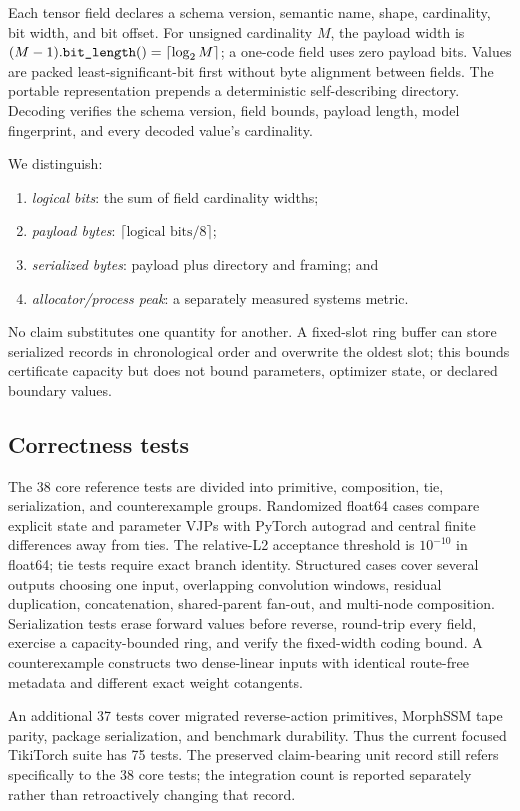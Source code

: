 Each tensor field declares a schema version, semantic name, shape,
cardinality, bit width, and bit offset.  For unsigned cardinality $M$, the
payload width is $(M-1).\texttt{bit\_length}()=\lceil\log_2M\rceil$; a
one-code field uses zero payload bits.  Values are packed least-significant-bit
first without byte alignment between fields.  The portable representation
prepends a deterministic self-describing directory.  Decoding verifies the
schema version, field bounds, payload length, model fingerprint, and every
decoded value's cardinality.

We distinguish:
\begin{enumerate}[leftmargin=1.5em]
  \item \emph{logical bits}: the sum of field cardinality widths;
  \item \emph{payload bytes}: $\lceil\text{logical bits}/8\rceil$;
  \item \emph{serialized bytes}: payload plus directory and framing; and
  \item \emph{allocator/process peak}: a separately measured systems metric.
\end{enumerate}
No claim substitutes one quantity for another.  A fixed-slot ring buffer can
store serialized records in chronological order and overwrite the oldest slot;
this bounds certificate capacity but does not bound parameters, optimizer
state, or declared boundary values.

\subsection{Correctness tests}

The 38 core reference tests are divided into primitive, composition, tie,
serialization, and counterexample groups.  Randomized float64 cases compare
explicit state and parameter VJPs with PyTorch autograd and central finite
differences away from ties.  The relative-L2 acceptance threshold is
$10^{-10}$ in float64; tie tests require exact branch identity.  Structured
cases cover several outputs choosing one input, overlapping convolution
windows, residual duplication, concatenation, shared-parent fan-out, and
multi-node composition.  Serialization tests erase forward values before
reverse, round-trip every field, exercise a capacity-bounded ring, and verify
the fixed-width coding bound.  A counterexample constructs two dense-linear
inputs with identical route-free metadata and different exact weight
cotangents.

An additional 37 tests cover migrated reverse-action primitives, MorphSSM tape
parity, package serialization, and benchmark durability.  Thus the current
focused TikiTorch suite has 75 tests.  The preserved claim-bearing unit record
still refers specifically to the 38 core tests; the integration count is
reported separately rather than retroactively changing that record.


